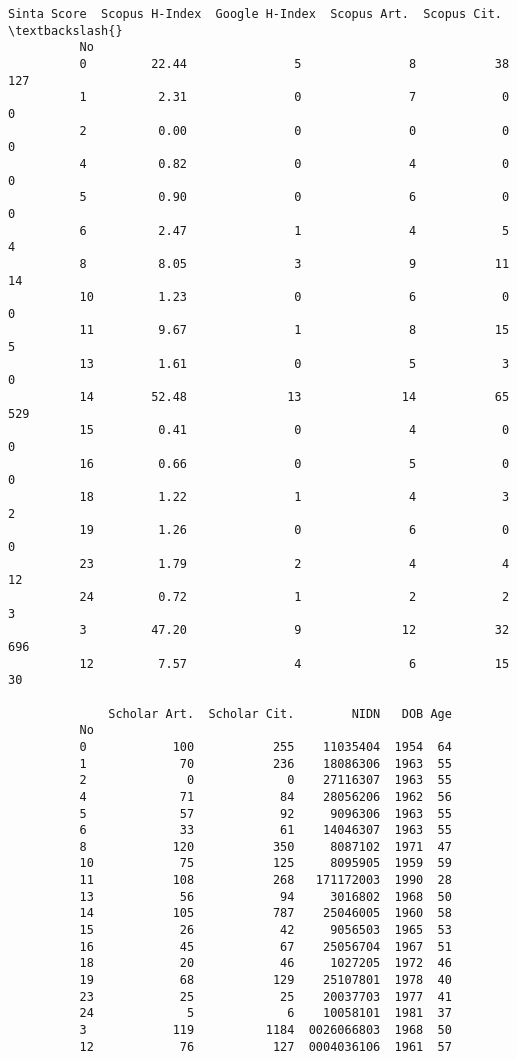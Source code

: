 \documentclass[11pt]{article}
\begin{document}
\begin{Verbatim}[commandchars=\\\{\}]
              Sinta Score  Scopus H-Index  Google H-Index  Scopus Art.  Scopus Cit.  \textbackslash{}
          No                                                                          
          0         22.44               5               8           38          127   
          1          2.31               0               7            0            0   
          2          0.00               0               0            0            0   
          4          0.82               0               4            0            0   
          5          0.90               0               6            0            0   
          6          2.47               1               4            5            4   
          8          8.05               3               9           11           14   
          10         1.23               0               6            0            0   
          11         9.67               1               8           15            5   
          13         1.61               0               5            3            0   
          14        52.48              13              14           65          529   
          15         0.41               0               4            0            0   
          16         0.66               0               5            0            0   
          18         1.22               1               4            3            2   
          19         1.26               0               6            0            0   
          23         1.79               2               4            4           12   
          24         0.72               1               2            2            3   
          3         47.20               9              12           32          696   
          12         7.57               4               6           15           30   
          
              Scholar Art.  Scholar Cit.        NIDN   DOB Age  
          No                                                    
          0            100           255    11035404  1954  64  
          1             70           236    18086306  1963  55  
          2              0             0    27116307  1963  55  
          4             71            84    28056206  1962  56  
          5             57            92     9096306  1963  55  
          6             33            61    14046307  1963  55  
          8            120           350     8087102  1971  47  
          10            75           125     8095905  1959  59  
          11           108           268   171172003  1990  28  
          13            56            94     3016802  1968  50  
          14           105           787    25046005  1960  58  
          15            26            42     9056503  1965  53  
          16            45            67    25056704  1967  51  
          18            20            46     1027205  1972  46  
          19            68           129    25107801  1978  40  
          23            25            25    20037703  1977  41  
          24             5             6    10058101  1981  37  
          3            119          1184  0026066803  1968  50  
          12            76           127  0004036106  1961  57  
\end{Verbatim}
        
\end{document}

